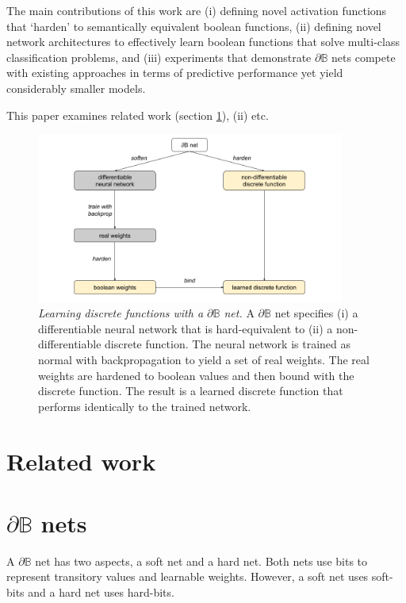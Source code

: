 \documentclass{article} %
\begin{document}
The main contributions of this work are (i) defining novel activation functions that `harden' to semantically equivalent boolean functions, (ii) defining novel network architectures to effectively learn boolean functions that solve multi-class classification problems, and (iii) experiments that demonstrate $\partial \mathbb{B}$ nets compete with existing approaches in terms of predictive performance yet yield considerably smaller models.

This paper examines related work (section \ref{sec:related-work}), (ii) etc.

\begin{figure}[h]
	\centering
	\includegraphics[width=0.9\textwidth]{db-net.png}
	\caption{{\em Learning discrete functions with a $\partial\mathbb{B}$ net.} A $\partial \mathbb{B}$ net specifies (i) a differentiable neural network that is hard-equivalent to (ii) a non-differentiable discrete function. The neural network is trained as normal with backpropagation to yield a set of real weights. The real weights are hardened to boolean values and then bound with the discrete function. The result is a learned discrete function that performs identically to the trained network.}
	\label{fig:main-idea}
\end{figure}


\section{Related work}\label{sec:related-work}

\section{$\partial\mathbb{B}$ nets}

A $\partial \mathbb{B}$ net has two aspects, a soft net and a hard net. Both nets use bits to represent transitory values and learnable weights. However, a soft net uses soft-bits and a hard net uses hard-bits.
\end{document}
